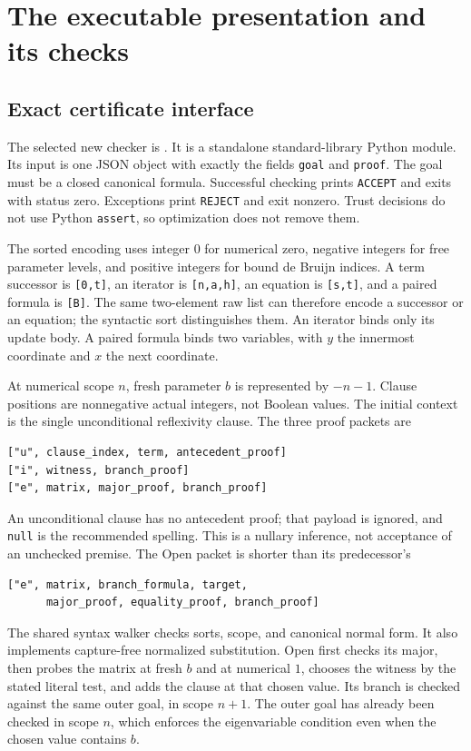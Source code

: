 \section{The executable presentation and its checks}
\label{sec:implementation}

\subsection{Exact certificate interface}

The selected new checker is .  It is a
standalone standard-library Python module.  Its input is one JSON object
with exactly the fields \texttt{goal} and \texttt{proof}.  The goal must
be a closed canonical formula.  Successful checking prints
\texttt{ACCEPT} and exits with status zero.  Exceptions print
\texttt{REJECT} and exit nonzero.  Trust decisions do not use Python
\texttt{assert}, so optimization does not remove them.

The sorted encoding uses integer $0$ for numerical zero, negative integers
for free parameter levels, and positive integers for bound de Bruijn
indices.  A term successor is \texttt{[0,t]}, an iterator is
\texttt{[n,a,h]}, an equation is \texttt{[s,t]}, and a paired formula is
\texttt{[B]}.  The same two-element raw list can therefore encode a
successor or an equation; the syntactic sort distinguishes them.  An
iterator binds only its update body.  A paired formula binds two variables,
with $y$ the innermost coordinate and $x$ the next coordinate.

At numerical scope $n$, fresh parameter $b$ is represented by $-n-1$.
Clause positions are nonnegative actual integers, not Boolean values.
The initial context is the single unconditional reflexivity clause.
The three proof packets are
\begin{verbatim}
["u", clause_index, term, antecedent_proof]
["i", witness, branch_proof]
["e", matrix, major_proof, branch_proof]
\end{verbatim}
An unconditional clause has no antecedent proof; that payload is ignored,
and \texttt{null} is the recommended spelling.  This is a nullary
inference, not acceptance of an unchecked premise.  The Open packet is
shorter than its predecessor's
\begin{verbatim}
["e", matrix, branch_formula, target,
      major_proof, equality_proof, branch_proof]
\end{verbatim}

The shared syntax walker checks sorts, scope, and canonical normal form.
It also implements capture-free normalized substitution.  Open first
checks its major, then probes the matrix at fresh $b$ and at numerical
$1$, chooses the witness by the stated literal test, and adds the clause
at that chosen value.  Its branch is checked against the same outer goal,
in scope $n+1$.  The outer goal has already been checked in scope $n$,
which enforces the eigenvariable condition even when the chosen value
contains $b$.

